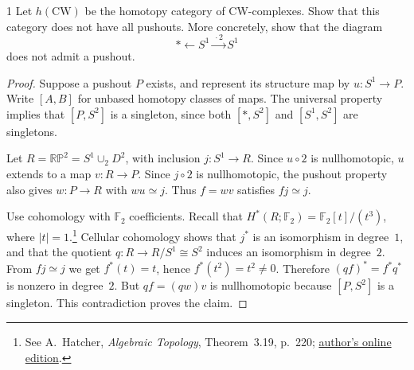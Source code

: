 \begin{exercise}{1}
Let $h(\mathrm{CW})$ be the homotopy category of CW-complexes. Show
that this category does not have all pushouts. More concretely, show
that the diagram
\[
 \ast\longleftarrow S^1\xrightarrow{\,\cdot 2\,}S^1
\]
does not admit a pushout.

\begin{proof}
Suppose a pushout $P$ exists, and represent its structure map by
$u\colon S^1\to P$. Write $[A,B]$ for unbased homotopy classes of maps.
The universal property implies that $[P,S^2]$ is a singleton, since
both $[*,S^2]$ and $[S^1,S^2]$ are singletons.

Let $R=\mathbb{RP}^2=S^1\cup_2 D^2$, with inclusion $j\colon S^1\to R$.
Since $u\circ 2$ is nullhomotopic, $u$ extends to a map $v\colon R\to P$.
Since $j\circ 2$ is nullhomotopic, the pushout property also gives
$w\colon P\to R$ with $wu\simeq j$. Thus $f=wv$ satisfies $fj\simeq j$.

Use cohomology with $\mathbb F_2$ coefficients. Recall that
$H^*(R;\mathbb F_2)=\mathbb F_2[t]/(t^3)$, where $|t|=1$.\footnote{See
A.~Hatcher, \emph{Algebraic Topology}, Theorem~3.19, p.~220;
\href{https://pi.math.cornell.edu/~hatcher/AT/ATch3.pdf}{author's online edition}.}
Cellular cohomology shows that $j^*$ is an isomorphism in degree~$1$,
and that the quotient $q\colon R\to R/S^1\cong S^2$ induces an
isomorphism in degree~$2$. From $fj\simeq j$ we get $f^*(t)=t$, hence
$f^*(t^2)=t^2\ne0$. Therefore $(qf)^*=f^*q^*$ is nonzero in degree~$2$.
But $qf=(qw)v$ is nullhomotopic because $[P,S^2]$ is a singleton.
This contradiction proves the claim.
\end{proof}
\end{exercise}
